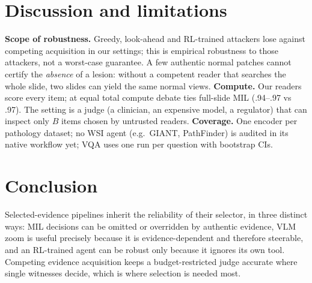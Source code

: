 \documentclass[10pt,twocolumn,letterpaper]{article}
\begin{document}
\section{Discussion and limitations}\label{sec:discussion}
\textbf{Scope of robustness.} Greedy, look-ahead and RL-trained attackers lose against competing acquisition in our settings; this is empirical robustness to those attackers, not a worst-case guarantee. A few authentic normal patches cannot certify the \emph{absence} of a lesion: without a competent reader that searches the whole slide, two slides can yield the same normal views. \textbf{Compute.} Our readers score every item; at equal total compute debate ties full-slide MIL (.94--.97 vs .97). The setting is a judge (a clinician, an expensive model, a regulator) that can inspect only $B$ items chosen by untrusted readers. \textbf{Coverage.} One encoder per pathology dataset; no WSI agent (e.g.\ GIANT, PathFinder) is audited in its native workflow yet; VQA uses one run per question with bootstrap CIs.

\section{Conclusion}
Selected-evidence pipelines inherit the reliability of their selector, in three distinct ways: MIL decisions can be omitted or overridden by authentic evidence, VLM zoom is useful precisely because it is evidence-dependent and therefore steerable, and an RL-trained agent can be robust only because it ignores its own tool. Competing evidence acquisition keeps a budget-restricted judge accurate where single witnesses decide, which is where selection is needed most.

{\small}
\end{document}
